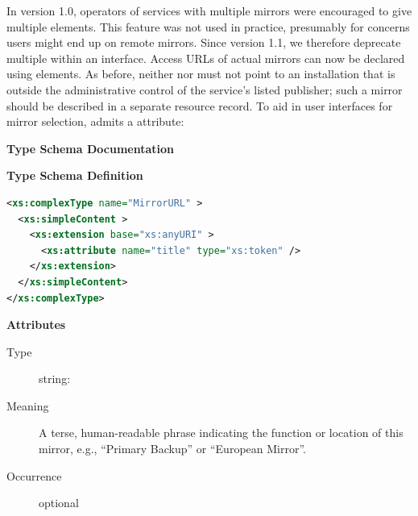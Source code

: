 \documentclass[11pt,a4paper]{ivoa}
\begin{document}

In version 1.0, operators of services with multiple mirrors were
encouraged to give multiple  elements.  This feature
was not used in practice, presumably for concerns users might end up on
remote mirrors.  Since version 1.1, we therefore deprecate multiple
 within an interface.  Access URLs of actual mirrors
can now be declared using  elements.
As before, neither
 nor  must not point to an installation
that is outside the administrative control of the service's listed
publisher; such a mirror should be described in a separate resource
record.  To aid in user interfaces for mirror selection,
 admits a  attribute:


\begin{generated}
\begingroup
        \renewcommand*\descriptionlabel[1]{%
        \hbox to 5.5em{\emph{#1}\hfil}}\vspace{2ex}\noindent\textbf{ Type Schema Documentation}


\vspace{1ex}\noindent\textbf{ Type Schema Definition}

\begin{lstlisting}[language=XML,basicstyle=\footnotesize]
<xs:complexType name="MirrorURL" >
  <xs:simpleContent >
    <xs:extension base="xs:anyURI" >
      <xs:attribute name="title" type="xs:token" />
    </xs:extension>
  </xs:simpleContent>
</xs:complexType>
\end{lstlisting}

\vspace{0.5ex}\noindent\textbf{ Attributes}

\begingroup\small\begin{bigdescription}
\item[title]
\begin{description}
\item[Type] string: 
\item[Meaning]
                  A terse, human-readable phrase indicating the function
                  or location of this mirror, e.g., “Primary Backup” or
                  “European Mirror”.

\item[Occurrence] optional
\end{description}


\end{bigdescription}\endgroup

\endgroup
\end{generated}
\end{document}
